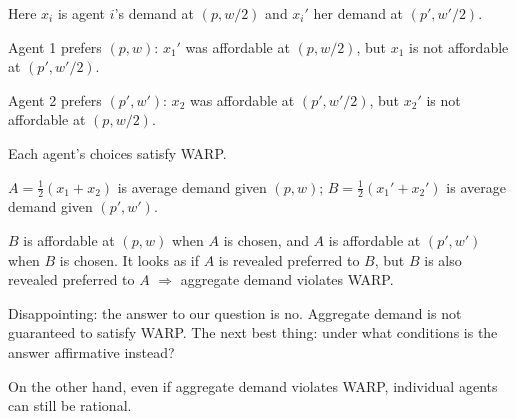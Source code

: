 \documentclass[11pt]{article}
\begin{document}
\begin{center}
\end{center}

Here $x_i$ is agent $i$'s demand at $(p,w/2)$ and $x_i'$ her demand at
$(p',w'/2)$.
\begin{flatlist}
  \item Agent 1 prefers $(p,w)$: $x_1'$ was affordable at $(p,w/2)$, but $x_1$ is
        not affordable at $(p',w'/2)$.
  \item Agent 2 prefers $(p',w')$: $x_2$ was affordable at $(p',w'/2)$, but
        $x_2'$ is not affordable at $(p,w/2)$.
  \item Each agent's choices satisfy WARP.
  \item $A=\tfrac12(x_1+x_2)$ is average demand given $(p,w)$;
        $B=\tfrac12(x_1'+x_2')$ is average demand given $(p',w')$.
\end{flatlist}
$B$ is affordable at $(p,w)$ when $A$ is chosen, and $A$ is affordable at
$(p',w')$ when $B$ is chosen. It looks as if $A$ is revealed preferred to $B$,
but $B$ is also revealed preferred to $A$ $\Rightarrow$ aggregate demand violates
WARP.

Disappointing: the answer to our question is no. Aggregate demand is not
guaranteed to satisfy WARP. The next best thing: under what conditions is the
answer affirmative instead?

On the other hand, even if aggregate demand violates WARP, individual agents can
still be rational.
\end{document}
